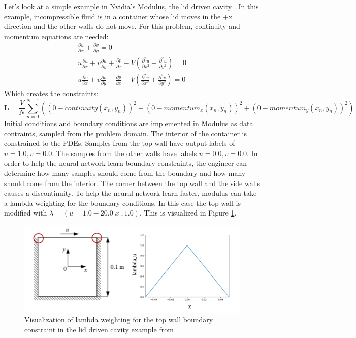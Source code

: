 \documentclass[]{article}
\begin{document}
Let's look at a simple example in Nvidia's Modulus, the lid driven cavity \cite{nvidia_modulus}.  In this example, incompressible fluid is in a container whose lid moves in the +x direction and the other walls do not move.  For this problem, continuity and momentum equations are needed:
\begin{gather}
\frac{\partial u}{\partial x} + \frac{\partial v}{\partial y} = 0 \\
u\frac{\partial u}{\partial x} + v\frac{\partial u}{\partial y} + \frac{\partial p}{\partial x} - \textit{V}(\frac{\partial^2u}{\partial x^2} + \frac{\partial^2u}{\partial y^2})= 0 \\
u\frac{\partial v}{\partial x} + v\frac{\partial v}{\partial y} + \frac{\partial p}{\partial x} - \textit{V}(\frac{\partial^2v}{\partial x^2} + \frac{\partial^2v}{\partial y^2})= 0
\end{gather}
Which creates the constraints:
\begin{equation}
\textbf{L} = \frac{V}{N}\sum_{n = 0}^{N - 1}((0 - continuity(x_n, y_n))^2 + (0 - momentum_x(x_n, y_n))^2 + (0 - momentum_y(x_n, y_n))^2) 
\end{equation}
Initial conditions and boundary conditions are implemented in Modulus as data contraints, sampled from the problem domain.  The interior of the container is constrained to the PDEs.  Samples from the top wall have output labels of $u=1.0, v = 0.0$.  The samples from the other walls have labels $u=0.0, v = 0.0$.  In order to help the neural network learn boundary constraints, the engineer can determine how many samples should come from the boundary and how many should come from the interior.  The corner between the top wall and the side walls causes a discontinuity.  To help the neural network learn faster, modulus can take a lambda weighting for the boundary conditions.  In this case the top wall is modified with $\lambda = (u = 1.0 - 20.0|x|, 1.0)$.  This is visualized in Figure \ref{fig:ldclambda}.
\begin{figure}
	\centering
	\includegraphics[width=1\linewidth]{images/ldc_lambda}
	\caption[ldc_weighting]{Visualization of lambda weighting for the top wall boundary constraint in the lid driven cavity example from \cite{nvidia_modulus}.}
	\label{fig:ldclambda}
\end{figure}
\end{document}
